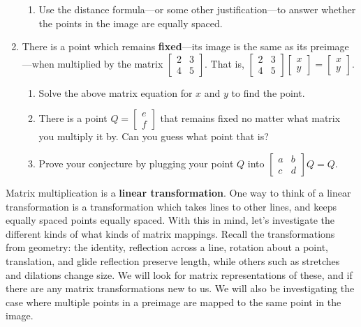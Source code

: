 \documentclass[../textbook.tex]{subfiles}
\begin{document}
\begin{enumerate}
\begin{enumerate}
\item Use the distance formula---or some other justification---to answer whether the points in the image are equally spaced.
\end{enumerate}
\item There is a point which remains \textbf{fixed}---its image is the same as its preimage---when multiplied by the matrix $\left[\begin{array}{cc}2 & 3 \\ 4 & 5 \end{array}\right]$. That is, $\left[\begin{array}{cc}2 & 3 \\ 4 & 5 \end{array}\right]\left[\begin{array}{c} x \\ y \end{array}\right]=\left[\begin{array}{c} x \\ y \end{array}\right]$.
\begin{enumerate}
\item Solve the above matrix equation for $x$ and $y$ to find the point.
\item There is a point $Q=\left[\begin{array}{c}e \\ f \end{array}\right]$ that remains fixed no matter what matrix you multiply it by. Can you guess what point that is?
\item Prove your conjecture by plugging your point $Q$ into $\left[\begin{array}{cc}a & b \\ c & d\end{array}\right]Q=Q$.
\end{enumerate}
\setcounter{mp_problem_i}{\value{enumi}}
\end{enumerate}

\noindent Matrix multiplication is a \textbf{linear transformation}. One way to think of a linear transformation is a transformation which takes lines to other lines, and keeps equally spaced points equally spaced. With this in mind, let's investigate the different kinds of what kinds of matrix mappings. Recall the transformations from geometry: the identity, reflection across a line, rotation about a point, translation, and glide reflection preserve length, while others such as stretches and dilations change size. We will look for matrix representations of these, and if there are any matrix transformations new to us. We will also be investigating the case where multiple points in a preimage are mapped to the same point in the image.
\end{document}
